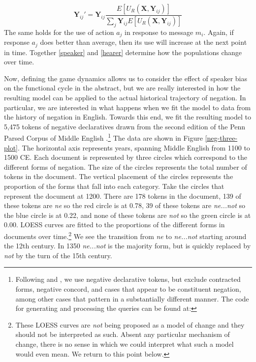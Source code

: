\documentclass[linguex]{sp}
\theoremstyle{definition} \newtheorem{definition}{Definition}
\begin{document}
\begin{equation}
     \mathbf{Y}_{ij}' = \mathbf{Y}_{ij}\frac{E[U_R(\mathbf{X}, \mathbf{Y}_{ij})]}{\sum_j \mathbf{Y}_{ij} E[U_R(\mathbf{X}, \mathbf{Y}_{ij})]}
          \label{hearer}
\end{equation}
The same holds for the use of action $a_j$ in response to message $m_i$. Again, if response $a_j$ does better than average, then its use will increase at the next point in time. Together  
\eqref{speaker} and \eqref{hearer} determine how the populations change over time.

Now, defining the game dynamics allows us to consider the effect of speaker bias on the functional cycle in the abstract, but we are really interested in how the resulting model can be applied to the actual historical trajectory of negation. In particular, we are interested in what happens when we fit the model to data from the history of negation in English. Towards this end, we fit the resulting model to 5,475 tokens of negative declaratives drawn from the second edition of the Penn Parsed Corpus of Middle English \citep{ppcme2}.\footnote{Following \cite{wallage2008} and \cite{ecay-tamminga2015}, we use negative declarative tokens, but exclude contracted forms, negative concord, and cases that appear to be constituent negation, among other cases that pattern in a substantially different manner. The code for generating and processing the queries can be found at: } The data are shown in Figure \ref{neg-three-plot}. The horizontal axis represents years, spanning Middle English from 1100 to 1500 CE. Each document is represented by three circles which correspond to the different forms of negation. The size of the circles represents the total number of tokens in the document. The vertical placement of the circles represents the proportion of the forms that fall into each category. Take the circles that represent the document at 1200.  There are 178 tokens in the document, 139 of these tokens are \textit{\color{red} ne} so the red circle is at 0.78, 39 of these tokens are \textit{\color{blue} ne...not} so the blue circle is at 0.22, and none of these tokens are \textit{\color{green} not} so the green circle is at 0.00.  LOESS curves are fitted to the proportions of the different forms in documents over time.\footnote{These LOESS curves are \emph{not} being proposed as a model of change and they should not be interpreted as such. Absent any particular mechanism of change, there is no sense in which we could interpret what such a model would even mean. We return to this point below.} We see the transition from \textit{\color{red} ne} to \textit{\color{blue} ne...not} starting around the 12th century. In 1350 \textit{\color{blue} ne...not} is the majority form, but is quickly replaced by \textit{\color{green} not} by the turn of the 15th century.
\end{document}
